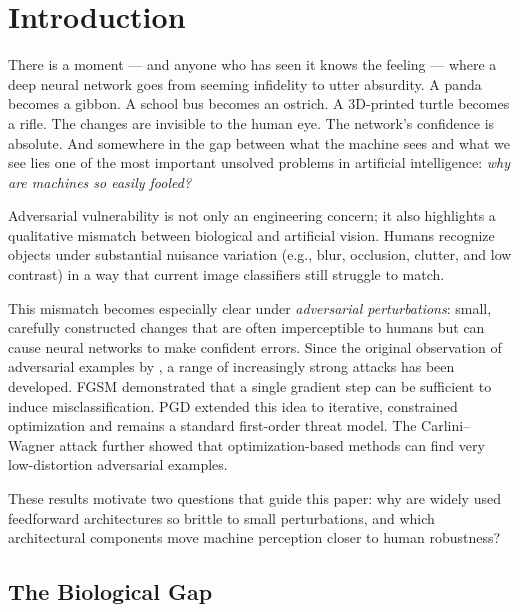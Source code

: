 \documentclass[12pt,a4paper]{article}
\begin{document}
\newpage
\tableofcontents
\newpage

\section{Introduction}
\label{sec:intro}

There is a moment --- and anyone who has seen it knows the feeling ---
where a deep neural network goes from seeming infidelity to utter
absurdity. A panda becomes a gibbon. A school bus becomes an ostrich.
A 3D-printed turtle becomes a rifle. The changes are invisible to the
human eye. The network's confidence is absolute. And somewhere in the
gap between what the machine sees and what we see lies one of the most
important unsolved problems in artificial intelligence: \textit{why are
machines so easily fooled?}

Adversarial vulnerability is not only an engineering concern; it also
highlights a qualitative mismatch between biological and artificial
vision. Humans recognize objects under substantial nuisance variation
(e.g., blur, occlusion, clutter, and low contrast) in a way that current
image classifiers still struggle to match.

This mismatch becomes especially clear under \textit{adversarial
perturbations}: small, carefully constructed changes that are often
imperceptible to humans but can cause neural networks to make confident
errors. Since the original observation of adversarial examples by
\citet{szegedy2013intriguing}, a range of increasingly strong attacks has
been developed. FGSM \citep{goodfellow2015explaining} demonstrated that a
single gradient step can be sufficient to induce misclassification. PGD
\citep{madry2018towards} extended this idea to iterative, constrained
optimization and remains a standard first-order threat model. The
Carlini--Wagner attack \citep{carlini2017towards} further showed that
optimization-based methods can find very low-distortion adversarial
examples.

These results motivate two questions that guide this paper: why are
widely used feedforward architectures so brittle to small perturbations,
and which architectural components move machine perception closer to
human robustness?

\subsection{The Biological Gap}
\end{document}
